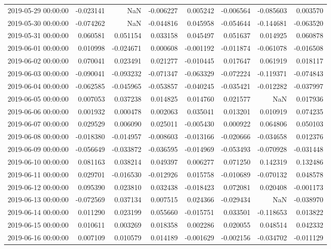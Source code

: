 \begin{tabular}{lrrrrrrr}
2019-05-29 00:00:00 & -0.023141 & NaN & -0.006227 & 0.005242 & -0.006564 & -0.085603 & 0.003570 \\
2019-05-30 00:00:00 & -0.074262 & NaN & -0.044816 & 0.045958 & -0.054644 & -0.144681 & -0.063520 \\
2019-05-31 00:00:00 & 0.060581 & 0.051154 & 0.033158 & 0.045497 & 0.051637 & 0.014925 & 0.060878 \\
2019-06-01 00:00:00 & 0.010998 & -0.024671 & 0.000608 & -0.001192 & -0.011874 & -0.061078 & -0.016508 \\
2019-06-02 00:00:00 & 0.070041 & 0.023491 & 0.021277 & -0.010445 & 0.017647 & 0.061919 & 0.018117 \\
2019-06-03 00:00:00 & -0.090041 & -0.093232 & -0.071347 & -0.063329 & -0.072224 & -0.119371 & -0.074843 \\
2019-06-04 00:00:00 & -0.062585 & -0.045965 & -0.053857 & -0.040245 & -0.035421 & -0.012282 & -0.037997 \\
2019-06-05 00:00:00 & 0.007053 & 0.037238 & 0.014825 & 0.014760 & 0.021577 & NaN & 0.017936 \\
2019-06-06 00:00:00 & 0.001932 & 0.000478 & 0.002063 & 0.035041 & 0.013201 & 0.010919 & 0.074235 \\
2019-06-07 00:00:00 & 0.029529 & 0.006090 & 0.025011 & -0.005430 & 0.000922 & 0.064806 & 0.050103 \\
2019-06-08 00:00:00 & -0.018380 & -0.014957 & -0.008603 & -0.013166 & -0.020666 & -0.034658 & 0.012376 \\
2019-06-09 00:00:00 & -0.056649 & -0.033872 & -0.036595 & -0.014969 & -0.053493 & -0.070928 & -0.031448 \\
2019-06-10 00:00:00 & 0.081163 & 0.038214 & 0.049397 & 0.006277 & 0.071250 & 0.142319 & 0.132486 \\
2019-06-11 00:00:00 & 0.029701 & -0.016530 & -0.012926 & 0.015758 & -0.010689 & -0.070132 & 0.048578 \\
2019-06-12 00:00:00 & 0.095390 & 0.023810 & 0.032438 & -0.018423 & 0.072081 & 0.020408 & -0.001173 \\
2019-06-13 00:00:00 & -0.072569 & 0.037134 & 0.007515 & 0.024366 & -0.029434 & NaN & -0.038970 \\
2019-06-14 00:00:00 & 0.011290 & 0.023199 & 0.055660 & -0.015751 & 0.033501 & -0.118653 & 0.013822 \\
2019-06-15 00:00:00 & 0.010611 & 0.003269 & 0.018358 & 0.002286 & 0.020055 & 0.048514 & 0.042332 \\
2019-06-16 00:00:00 & 0.007109 & 0.010579 & 0.014189 & -0.001629 & -0.002156 & -0.034702 & -0.011129 \\

\end{tabular}
